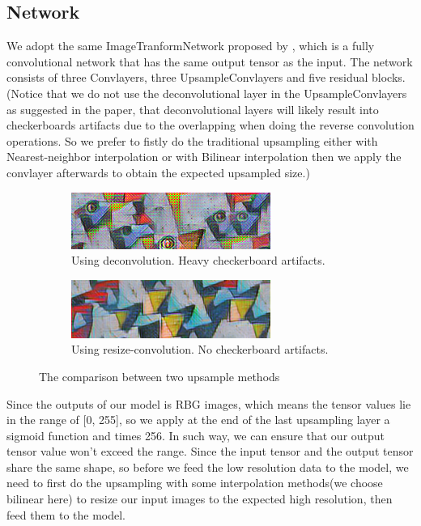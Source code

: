 \documentclass[a4paper,12pt,twoside]{report}
\begin{document}
\subsection{Network}
We adopt the same ImageTranformNetwork proposed by \citeauthor{johnson2016perceptual}, which is a fully convolutional network that has the same output tensor as the input. The network consists of three Convlayers, three UpsampleConvlayers and five residual blocks.(Notice that we do not use the deconvolutional layer in the UpsampleConvlayers as suggested in the paper\cite{odena2016deconvolution}, that deconvolutional layers will likely result into checkerboards artifacts due to the overlapping when doing the reverse convolution operations. So we prefer to fistly do the traditional upsampling either with Nearest-neighbor interpolation or with Bilinear interpolation then we apply the convlayer afterwards to obtain the expected upsampled size.)
\begin{figure}
\centering
\begin{subfigure}{0.49\textwidth}
  \centering
  \includegraphics[scale=0.6]{style_artifacts.png}
  \caption{Using deconvolution. Heavy checkerboard artifacts.}
\end{subfigure}
\begin{subfigure}{0.49\textwidth}
  \centering
  \includegraphics[scale=0.6]{style_clean.png}
  \caption{Using resize-convolution. No checkerboard artifacts.}
\end{subfigure}
\caption{The comparison between two upsample methods\cite{odena2016deconvolution}}
\end{figure}

Since the outputs of our model is RBG images, which means the tensor values lie in the range of [0, 255], so we apply at the end of the last upsampling layer a sigmoid function and times 256. In such way, we can ensure that our output tensor value won't exceed the range. Since the input tensor and the output tensor share the same shape, so before we feed the low resolution data to the model, we need to first do the upsampling with some interpolation methods(we choose bilinear here) to resize our input images to the expected high resolution, then feed them to the model. 
\end{document}
